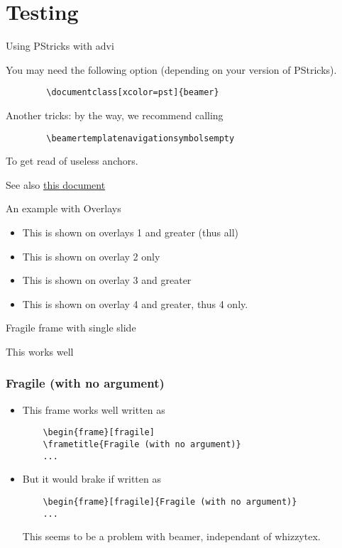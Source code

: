 \documentclass[xcolor=pst]{beamer}
\begin{document}
\section{Testing}
\begin{frame}[fragile=singleslide]{Using PStricks with advi}

You may need the following option (depending on your version of PStricks). 
\begin{verbatim}
        \documentclass[xcolor=pst]{beamer}
\end{verbatim}

Another tricks: by the way, we recommend calling
\begin{verbatim}
        \beamertemplatenavigationsymbolsempty
\end{verbatim}
To get read of useless anchors.

See also 
\href{http://www.giref.ulaval.ca/~ctibirna/work/readings/beamer_pstricks.pdf}
{this document} 
\end{frame}
\begin{frame}{An example with Overlays}
\begin{itemize}
\item<1-> This is shown on overlays 1 and greater (thus all)
\item<2> This is shown on overlay 2 only
\item<3-> This is shown on overlay 3 and greater
\item<4-> This is shown on overlay 4 and greater, thus  4 only.
\end{itemize}
\end{frame}
\begin{frame}[fragile=singleslide]{Fragile frame with single slide}

This works well
\end{frame}
\begin{frame}[fragile]
\frametitle{Fragile (with no argument)}
\begin{itemize}

\item <1->
This frame works well written as
 \begin{verbatim}
    \begin{frame}[fragile]
    \frametitle{Fragile (with no argument)}
    ...
\end{verbatim}
\item <2-> 
But it would brake if written as
 \begin{verbatim}
    \begin{frame}[fragile]{Fragile (with no argument)}
    ...
\end{verbatim}
This seems to be a problem with beamer, independant of whizzytex.
\end{itemize}
\end{frame}
\end{document}
